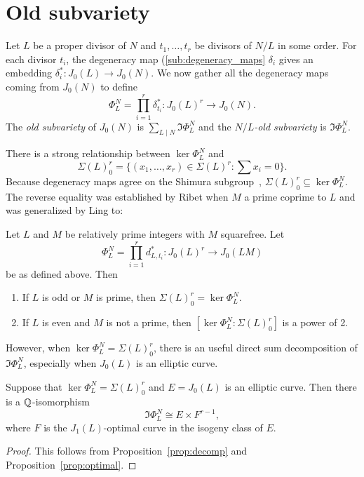 \documentclass[11pt, proquest]{uwthesis}
\begin{document}
\section{Old subvariety}%
\label{sec:old_subvariety}

Let $L$ be a proper divisor of $N$ and $t_1,\ldots,t_r$ be divisors of $N/L$ in
some order. For each divisor $t_i$, the degeneracy map
(\ref{sub:degeneracy_maps} $\delta_i$ gives an
embedding $\delta_{i} ^*:J_0(L)\to J_0(N)$. We now gather all the degeneracy
maps coming from $J_0(N)$ to define
\[
    \Phi_L ^N = \prod_{i=1} ^r \delta_{t_i} ^* : J_0(L)^r \to J_0(N).
\]
The \emph{old subvariety} of $J_0(N)$ is $\sum_{L\mid N} \Im\Phi_L ^N$ and the
\emph{$N/L$-old subvariety} is $\Im\Phi_L ^N$.

There is a strong relationship between $\ker \Phi_L ^N$ and
\[
    \Sigma(L)_0 ^r =\{(x_1,\ldots,x_r)\in \Sigma(L)^r: \sum x_i = 0\}.
\]
Because degeneracy maps agree on the Shimura subgroup~\cite[Theorem
4]{ling-oesterle:shimura}, $\Sigma(L)_0 ^r \subseteq \ker\Phi_L ^N$. The reverse
equality was established by Ribet when $M$ a prime coprime to $L$ and was
generalized by Ling to:
\begin{theorem}
    \label{thm:ribet-ling}
    Let $L$ and $M$ be relatively prime integers with $M$ squarefree. Let
    \[
        \Phi_L ^N = \prod_{i=1} ^r d_{L,t_i} ^* : J_0(L)^r \to J_0(LM)
    \]
    be as defined above. Then
    \begin{enumerate}
        \item
            If $L$ is odd or $M$ is prime, then $\Sigma(L)_0 ^r=\ker\Phi_L ^N$.
        \item
            If $L$ is even and $M$ is not a prime, then $[\ker\Phi_L ^N:
            \Sigma(L)_0 ^r]$ is a power of 2.
    \end{enumerate}
\end{theorem}

However, when $\ker\Phi_L ^N = \Sigma(L)_0 ^r$, there is an useful direct sum
decomposition of $\Im\Phi_L ^N$, especially when $J_0(L)$ is an elliptic curve.

\begin{corollary}
    \label{cor:elliptic_decomp}
    Suppose that $\ker\Phi_L ^N = \Sigma(L)_0 ^r$ and $E=J_0(L)$ is an elliptic
    curve. Then there is a $\mathbb{Q}$-isomorphism
    \[
        \Im\Phi_L ^N \cong E \times F^{r-1},
    \]
    where $F$ is the $J_1(L)$-optimal curve in the isogeny class of $E$.
\end{corollary}
\begin{proof}
    This follows from Proposition~\ref{prop:decomp} and
    Proposition~\ref{prop:optimal}.
\end{proof}
\end{document}
